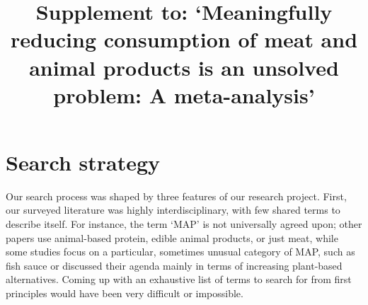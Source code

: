 \documentclass[sn-nature,referee,lineno,pdflatex]{sn-jnl}
\begin{document}
\title[MAP-reduction-supplement]{Supplement to: `Meaningfully reducing
consumption of meat and animal products is an unsolved problem: A
meta-analysis'}


\author*[1]{  }

\author[2]{  }

\author[1]{  }




\abstract{}




\maketitle

\section{Search strategy}\label{search-strategy}

Our search process was shaped by three features of our research project.
First, our surveyed literature was highly interdisciplinary, with few
shared terms to describe itself. For instance, the term `MAP' is not
universally agreed upon; other papers use animal-based protein, edible
animal products, or just meat, while some studies focus on a particular,
sometimes unusual category of MAP, such as fish sauce
\citep{kanchanachitra2020} or discussed their agenda mainly in terms of
increasing plant-based alternatives. Coming up with an exhaustive list
of terms to search for from first principles would have been very
difficult or impossible.
\end{document}
